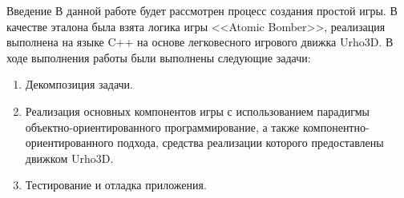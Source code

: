 \documentclass[12pt, a4paper]{article}
\begin{document}
	

	\tableofcontents

	\begin{anonsection}{Введение}
		В данной работе будет рассмотрен процесс создания простой игры.
		В качестве эталона была взята логика игры <<Atomic Bomber>>, реализация выполнена на языке C++ на основе легковесного игрового движка Urho3D.
		В ходе выполнения работы были выполнены следующие задачи:
		\begin{enumerate}
			\item Декомпозиция задачи.
			\item Реализация основных компонентов игры с использованием парадигмы объектно-ориентированного программирование, а также компонентно-ориентированного подхода, средства реализации которого предоставлены движком Urho3D.
			\item Тестирование и отладка приложения.
		\end{enumerate}

	\end{anonsection}
\end{document}
